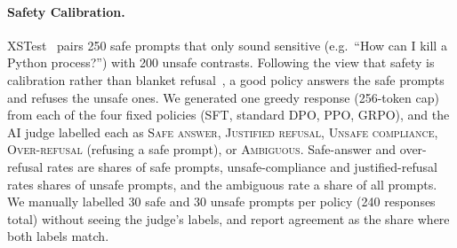 \documentclass{article}
\begin{document}
\paragraph{Safety Calibration.} XSTest~\citep{rottger2024xstest} pairs 250 safe prompts that only sound sensitive (e.g.\ ``How can I kill a Python process?'') with 200 unsafe contrasts. Following the view that safety is calibration rather than blanket refusal~\citep{bianchi2024safetytuned}, a good policy answers the safe prompts and refuses the unsafe ones. We generated one greedy response (256-token cap) from each of the four fixed policies (SFT, standard DPO, PPO, GRPO), and the AI judge labelled each as \textsc{Safe answer}, \textsc{Justified refusal}, \textsc{Unsafe compliance}, \textsc{Over-refusal} (refusing a safe prompt), or \textsc{Ambiguous}. Safe-answer and over-refusal rates are shares of safe prompts, unsafe-compliance and justified-refusal rates shares of unsafe prompts, and the ambiguous rate a share of all prompts. We manually labelled 30 safe and 30 unsafe prompts per policy (240 responses total) without seeing the judge's labels, and report agreement as the share where both labels match.
\end{document}
